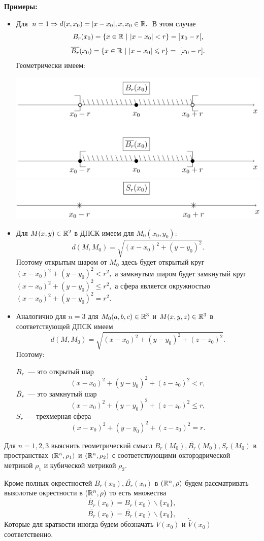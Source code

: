 \documentclass[../../main.tex]{subfiles}
\begin{document}
	\smallskip
	\textbf{Примеры:}
	\begin{itemize}
	\item Для $n = 1 \Rightarrow d(x, x_0) = |x - x_0|, x, x_0 \in \mathbb{R}.$ В этом случае 
	$$
		B_r(x_0) = \{x \in \mathbb{R}\ |\ |x - x_0| < r\} =\ ] x_0 - r [,
	$$
	$$
		\overline{B_r}(x_0) = \{x \in \mathbb{R}\ |\ |x - x_0| \leqslant r\} =\ [ x_0 - r ].
	$$
	Геометрически имеем:
	
	\includegraphics[width=\linewidth]{2019-02-15_17-21-02.png}
	\includegraphics[width=\linewidth]{2019-02-15_17-21-17.png}
	
	
	\item  Для $M(x, y) \in \mathbb{R}^2$ в ДПСК имеем для $M_0(x_0, y_0)$:
	$$
		d(M, M_0) = \sqrt{(x - x_0)^2 + (y - y_0)^2}.
	$$
	Поэтому открытым шаром от $M_0$ здесь будет открытый круг 
	$
		(x - x_0)^2 + (y - y_0)^2 < r^2,
	$ 
	а замкнутым шаром будет замкнутый круг 
	$
		(x - x_0)^2 + (y - y_0)^2 \leqslant r^2,
	$ 
	а сфера является окружностью 
	$
		(x - x_0)^2 + (y - y_0)^2 = r^2.
	$ 
	
	\item Аналогично для $n = 3$ для $M_0(a, b, c) \in \mathbb{R}^3$ и $M(x, y, z) \in \mathbb{R}^3$ в соответствующей ДПСК имеем  
	$$
		d(M, M_0) = \sqrt{(x - x_0)^2 + (y - y_0)^2 + (z - z_0)^2}.
	$$
	Поэтому:
	
	$B_r$~--- это открытый шар
	$$
		(x - x_0)^2 + (y - y_0)^2 + (z - z_0)^2 < r,
	$$
	$\overline{B_r}$~--- это замкнутый шар
	$$
	(x - x_0)^2 + (y - y_0)^2 + (z - z_0)^2 \leqslant r,
	$$	
	$S_r$~--- трехмерная сфера
	$$
	(x - x_0)^2 + (y - y_0)^2 + (z - z_0)^2 = r.
	$$
	\end{itemize}
	\begin{exc}
		Для $n = 1, 2, 3$  выяснить геометрический смысл $B_r(M_0), \overline{B_r}(M_0),  S_r(M_0)$ в пространствах $(\mathbb{R}^n, \rho_1)$ и $(\mathbb{R}^n, \rho_2)$  с соответствующими окторэдрической метрикой $\rho_1$ и кубической метрикой $\rho_2$. 
	\end{exc}
	\begin{rem}
		Кроме полных окрестностей $B_r(x_0), \overline{B_r}(x_0)$ в $(\mathbb{R}^n, \rho)$ будем рассматривать выколотые окрестности в $(\mathbb{R}^n, \rho)$ то есть множества
		$$
			\dot{B_r}(x_0) = B_r(x_0) \backslash \{x_0\},
		$$
		$$
			\dot{\bar{B_r}}(x_0) = \bar{B_r}(x_0) \backslash \{x_0\},
		$$
		Которые для краткости иногда будем обозначать $\dot{V}(x_0) $ и $\dot{\bar{V}}(x_0)$ соответственно. 
	\end{rem}
	\smallskip
	
\end{document}
